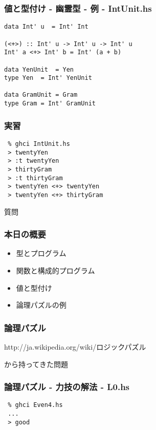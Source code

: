 \documentclass[cjk,dvipdfm,14pt]{beamer}
\begin{document}
\begin{frame}[fragile]
\frametitle{値と型付け - 幽霊型 - 例 - IntUnit.hs}

\begin{lstlisting}
data Int' u  = Int' Int

(<+>) :: Int' u -> Int' u -> Int' u
Int' a <+> Int' b = Int' (a + b)

data YenUnit  = Yen
type Yen  = Int' YenUnit

data GramUnit = Gram
type Gram = Int' GramUnit
\end{lstlisting}

\end{frame}

\begin{frame}[fragile]
\frametitle{実習}

\begin{lstlisting}
 % ghci IntUnit.hs
 > twentyYen
 > :t twentyYen
 > thirtyGram
 > :t thirtyGram
 > twentyYen <+> twentyYen
 > twentyYen <+> thirtyGram
\end{lstlisting}

\end{frame}

\begin{frame}[fragile]
質問
\end{frame}

\begin{frame}[fragile]
\frametitle{本日の概要}

\begin{itemize}
\item 型とプログラム
\item 関数と構成的プログラム
\item 値と型付け
\item { \color{red} 論理パズルの例 }
\end{itemize}

\end{frame}

\begin{frame}[fragile]
\frametitle{論理パズル}

http://ja.wikipedia.org/wiki/ロジックパズル

から持ってきた問題

\end{frame}

\begin{frame}[fragile]
\frametitle{論理パズル - 力技の解法 - L0.hs}

\begin{lstlisting}
 % ghci Even4.hs
 ...
 > good
\end{lstlisting}

\end{frame}
\end{document}
